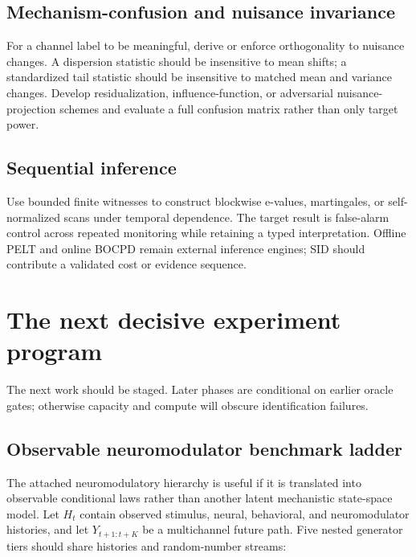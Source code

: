 \documentclass[10pt]{article}
\begin{document}
\subsection{Mechanism-confusion and nuisance invariance}

For a channel label to be meaningful, derive or enforce orthogonality to nuisance changes. A dispersion statistic should be insensitive to mean shifts; a standardized tail statistic should be insensitive to matched mean and variance changes. Develop residualization, influence-function, or adversarial nuisance-projection schemes and evaluate a full confusion matrix rather than only target power.

\subsection{Sequential inference}

Use bounded finite witnesses to construct blockwise e-values, martingales, or self-normalized scans under temporal dependence. The target result is false-alarm control across repeated monitoring while retaining a typed interpretation. Offline PELT and online BOCPD remain external inference engines; SID should contribute a validated cost or evidence sequence.

\section{The next decisive experiment program}

The next work should be staged. Later phases are conditional on earlier oracle gates; otherwise capacity and compute will obscure identification failures.

\subsection{Observable neuromodulator benchmark ladder}

The attached neuromodulatory hierarchy is useful if it is translated into
observable conditional laws rather than another latent mechanistic state-space
model.  Let $H_t$ contain observed stimulus, neural, behavioral, and
neuromodulator histories, and let $Y_{t+1:t+K}$ be a multichannel future path.
Five nested generator tiers should share histories and random-number streams:
\end{document}
